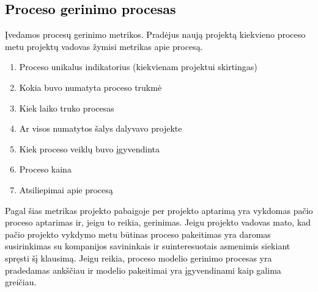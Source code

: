 \documentclass{VUMIFPSkursinis}
\begin{document}
	\subsection{\textcolor{black}{Proceso gerinimo procesas}}
		\textcolor{black}{Įvedamos procesų gerinimo metrikos.}
		\textcolor{black}{Pradėjus naują projektą kiekvieno proceso metu projektų vadovas žymisi metrikas apie procesą.}
			\begin{enumerate}
				\item{\textcolor{black}{Proceso unikalus indikatorius (kiekvienam projektui skirtingas)}}
				\item{\textcolor{black}{Kokia buvo numatyta proceso trukmė}}
				\item{\textcolor{black}{Kiek laiko truko procesas}}
				\item{\textcolor{black}{Ar visos numatytos šalys dalyvavo projekte}}
				\item{\textcolor{black}{Kiek proceso veiklų buvo įgyvendinta}}
				\item{\textcolor{black}{Proceso kaina}}
				\item{\textcolor{black}{Atsiliepimai apie procesą}}
			\end{enumerate}
		\textcolor{black}{Pagal šias metrikas projekto pabaigoje per projekto aptarimą yra vykdomas pačio proceso aptarimas ir, jeigu to reikia, gerinimas.
				Jeigu projekto vadovas mato, kad pačio projekto vykdymo metu būtinas proceso pakeitimas yra daromas susirinkimas su kompanijos savininkais ir suinteresuotais asmenimis siekiant spręsti šį klausimą. 
				Jeigu reikia, proceso modelio gerinimo procesas yra pradedamas ankščiau ir modelio pakeitimai yra įgyvendinami kaip galima greičiau.}
\end{document}
